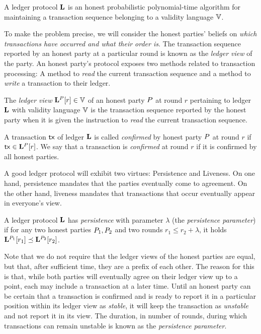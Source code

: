 \begin{definition}[Ledger]
  A ledger protocol $\mathbf{L}$ is an honest probabilistic polynomial-time
  algorithm for maintaining a transaction sequence belonging to a validity
  language $\mathbb{V}$.
\end{definition}

To make the problem precise, we will consider the honest parties' beliefs on
\emph{which transactions have occurred and what their order is}. The transaction
sequence reported by an honest party at a particular round is known as the
\emph{ledger view} of the party. An honest party's protocol exposes two
methods related to transaction processing: A method to \emph{read} the current
transaction sequence and a method to \emph{write} a transaction to their ledger.

\begin{definition}
  The \emph{ledger view} $\mathbf{L}^{P}[r] \in \mathbb{V}$ of an honest
  party $P$ at round $r$ pertaining to ledger $\mathbf{L}$ with validity
  language $\mathbb{V}$ is the transaction sequence reported by the honest party
  when it is given the instruction to \emph{read} the current transaction
  sequence.
\end{definition}

\begin{definition}[Confirmation]
  A transaction $\mathsf{tx}$ of ledger $\mathbf{L}$ is called \emph{confirmed} by honest
  party $P$ at round $r$ if $\mathsf{tx} \in \mathbf{L}^{P}[r]$. We say
  that a transaction is \emph{confirmed} at round $r$ if it is confirmed by all
  honest parties.
\end{definition}

A good ledger protocol will exhibit two virtues: Persistence and Liveness. On
one hand, persistence mandates that the parties eventually come to agreement.
On the other hand, liveness mandates that transactions that occur eventually
appear in everyone's view.

\begin{definition}[Persistence]
  A ledger protocol $\mathbf{L}$ has \emph{persistence} with parameter $\lambda$
  (the \emph{persistence parameter}) if for
  any two honest parties $P_1,P_2$ and two rounds $r_1\leq r_2 +
  \lambda$, it holds $\mathbf{L}^{P_1}[r_1] \preceq
  \mathbf{L}^{P_2}[r_2]$.
\end{definition}

Note that we do not require that the ledger views of the honest parties are
equal, but that, after sufficient time, they are a prefix of each other. The
reason for this is that, while both parties will eventually agree on their
ledger view up to a point, each may include a transaction at a later time. Until
an honest party can be certain that a transaction is confirmed and is ready to
report it in a particular position within its ledger view as \emph{stable}, it
will keep the transaction as \emph{unstable} and not report it in its view. The
duration, in number of rounds, during which transactions can remain unstable is
known as the \emph{persistence parameter}.

